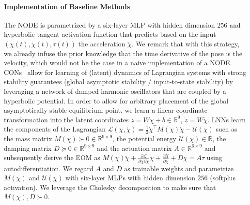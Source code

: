 \paragraph{Implementation of Baseline Methods}
The \gls{NODE} is parametrized by a six-layer \gls{MLP} with hidden dimension $256$ and hyperbolic tangent activation function that predicts based on the input $(\chi(t), \dot{\chi}(t), \tau(t))$ the acceleration $\ddot{\chi}$. We remark that with this strategy, we already infuse the prior knowledge that the time derivative of the pose is the velocity, which would not be the case in a naive implementation of a \gls{NODE}.
\glspl{CON}~\cite{stolzle2024input} allow for learning of (latent) dynamics of Lagrangian systems with strong stability guarantees (global asymptotic stability / input-to-state stability) by leveraging a network of damped harmonic oscillators that are coupled by a hyperbolic potential. In order to allow for arbitrary placement of the global asymptotically stable equilibrium point, we learn a linear coordinate transformation into the latent coordinates $z = W \chi + b \in \mathbb{R}^9$, $\dot{z} = W \dot{\chi}$. %
\glspl{LNN} learn the components of the Lagrangian $\mathcal{L}(\chi, \dot{\chi}) = \frac{1}{2} \dot{\chi}^\top M(\chi) \dot{\chi} - \mathcal{U}(\chi)$ such as the mass matrix $M(\chi) \succ 0 \in \mathbb{R}^{9 \times 9}$, the potential energy $\mathcal{U}(\chi) \in \mathbb{R}$, the damping matrix $D \succeq 0 \in \mathbb{R}^{9 \times 9}$ and the actuation matrix $A \in \mathbb{R}^{6 \times 9}$ and subsequently derive the \gls{EOM} as $M(\chi) \ddot{\chi} + \frac{\partial \mathcal{L}}{\partial \chi \partial \dot{\chi}} \dot{\chi} + \frac{\partial \mathcal{U}}{\partial \chi} + D \dot{\chi} = A \tau$ using autodifferentiation.
We regard $A$ and $D$ as trainable weights and parametrize $M(\chi)$ and $\mathcal{U}(\chi)$ with six-layer \glspl{MLP} with hidden dimension $256$ (softplus activation). We leverage the Cholesky decomposition to make sure that $M(\chi), D \succ 0$.

